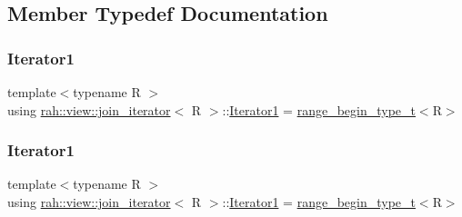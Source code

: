\subsection{Member Typedef Documentation}
\mbox{\label{structrah_1_1view_1_1join__iterator_a8b71c6f25eee2915e2a8afc6e024196d}} 
\subsubsection{\texorpdfstring{Iterator1}{Iterator1}\hspace{0.1cm}{\footnotesize\ttfamily [1/2]}}
{\footnotesize\ttfamily template$<$typename R $>$ \\
using \mbox{\hyperlink{structrah_1_1view_1_1join__iterator}{rah\+::view\+::join\+\_\+iterator}}$<$ R $>$\+::\mbox{\hyperlink{structrah_1_1view_1_1join__iterator_a8b71c6f25eee2915e2a8afc6e024196d}{Iterator1}} =  \mbox{\hyperlink{namespacerah_a28aff4eeddcece6be65ff0b956d32d4a}{range\+\_\+begin\+\_\+type\+\_\+t}}$<$R$>$}

\mbox{\label{structrah_1_1view_1_1join__iterator_a8b71c6f25eee2915e2a8afc6e024196d}} 
\subsubsection{\texorpdfstring{Iterator1}{Iterator1}\hspace{0.1cm}{\footnotesize\ttfamily [2/2]}}
{\footnotesize\ttfamily template$<$typename R $>$ \\
using \mbox{\hyperlink{structrah_1_1view_1_1join__iterator}{rah\+::view\+::join\+\_\+iterator}}$<$ R $>$\+::\mbox{\hyperlink{structrah_1_1view_1_1join__iterator_a8b71c6f25eee2915e2a8afc6e024196d}{Iterator1}} =  \mbox{\hyperlink{namespacerah_a28aff4eeddcece6be65ff0b956d32d4a}{range\+\_\+begin\+\_\+type\+\_\+t}}$<$R$>$}

\mbox{\label{structrah_1_1view_1_1join__iterator_ae03a066174f3422c70d0e3c22e68d9f7}} 
